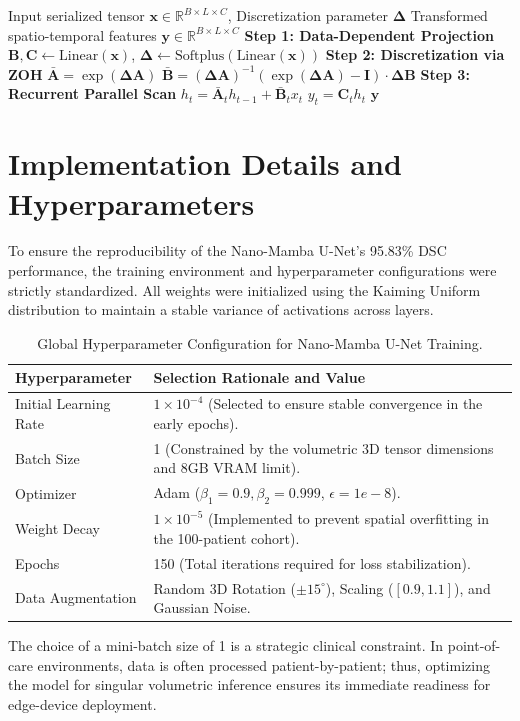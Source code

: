 \begin{algorithm}[hbt!]
\caption{Selective Scan Mechanism for 3D Cardiac Tensors}
\label{alg:mamba}
\begin{algorithmic}[1]
\REQUIRE Input serialized tensor $\mathbf{x} \in \mathbb{R}^{B \times L \times C}$, Discretization parameter $\mathbf{\Delta}$
\ENSURE Transformed spatio-temporal features $\mathbf{y} \in \mathbb{R}^{B \times L \times C}$
\STATE \textbf{Step 1: Data-Dependent Projection}
\STATE $\mathbf{B}, \mathbf{C} \leftarrow \text{Linear}(\mathbf{x})$, $\mathbf{\Delta} \leftarrow \text{Softplus}(\text{Linear}(\mathbf{x}))$
\STATE \textbf{Step 2: Discretization via ZOH}
\STATE $\mathbf{\bar{A}} = \exp(\mathbf{\Delta} \mathbf{A})$
\STATE $\mathbf{\bar{B}} = (\mathbf{\Delta} \mathbf{A})^{-1} (\exp(\mathbf{\Delta} \mathbf{A}) - \mathbf{I}) \cdot \mathbf{\Delta} \mathbf{B}$
\STATE \textbf{Step 3: Recurrent Parallel Scan}
    \STATE $h_t = \mathbf{\bar{A}}_t h_{t-1} + \mathbf{\bar{B}}_t x_t$
    \STATE $y_t = \mathbf{C}_t h_t$
\ENDFOR
\RETURN $\mathbf{y}$
\end{algorithmic}
\end{algorithm}

\section{Implementation Details and Hyperparameters}
To ensure the reproducibility of the Nano-Mamba U-Net's 95.83\% DSC performance, the training environment and hyperparameter configurations were strictly standardized. All weights were initialized using the Kaiming Uniform distribution \cite{he2015delving} to maintain a stable variance of activations across layers.

\begin{table}[hbt!]
\caption{Global Hyperparameter Configuration for Nano-Mamba U-Net Training.}
\label{tab:hyperparams}
\centering
\begin{tabular}{l | p{8cm}}
\hline
\textbf{Hyperparameter} & \textbf{Selection Rationale and Value} \\
\hline
Initial Learning Rate & $1 \times 10^{-4}$ (Selected to ensure stable convergence in the early epochs). \\
Batch Size & 1 (Constrained by the volumetric 3D tensor dimensions and 8GB VRAM limit). \\
Optimizer & Adam ($\beta_1=0.9, \beta_2=0.999$, $\epsilon=1e-8$). \\
Weight Decay & $1 \times 10^{-5}$ (Implemented to prevent spatial overfitting in the 100-patient cohort). \\
Epochs & 150 (Total iterations required for loss stabilization). \\
Data Augmentation & Random 3D Rotation ($\pm 15^\circ$), Scaling ($[0.9, 1.1]$), and Gaussian Noise. \\
\hline
\end{tabular}
\end{table}

The choice of a mini-batch size of 1 is a strategic clinical constraint. In point-of-care environments, data is often processed patient-by-patient; thus, optimizing the model for singular volumetric inference ensures its immediate readiness for edge-device deployment.
